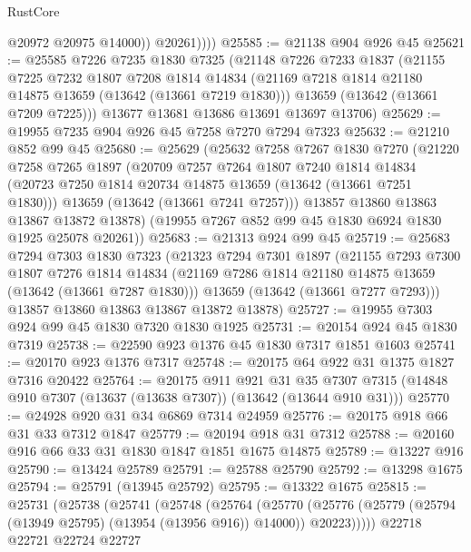 \begin{lexlean}{RustCore}
\begin{coremodule}
                @20972
                @20975
                @14000))
            @20261))))
@25585 := @21138 @904 @926 @45
@25621 := @25585
    @7226
    @7235
    @1830
    @7325
    (@21148
      @7226
      @7233
      @1837
      (@21155
        @7225
        @7232
        @1807
        @7208
        @1814
        @14834
        (@21169 @7218 @1814 @21180 @14875 @13659 (@13642 (@13661 @7219 @1830)))
        @13659
        (@13642 (@13661 @7209 @7225)))
      @13677
      @13681
      @13686
      @13691
      @13697
      @13706)
@25629 := @19955 @7235 @904 @926 @45 @7258 @7270 @7294 @7323
@25632 := @21210 @852 @99 @45
@25680 := @25629
    (@25632
      @7258
      @7267
      @1830
      @7270
      (@21220
        @7258
        @7265
        @1897
        (@20709
          @7257
          @7264
          @1807
          @7240
          @1814
          @14834
          (@20723 @7250 @1814 @20734 @14875 @13659 (@13642 (@13661 @7251 @1830)))
          @13659
          (@13642 (@13661 @7241 @7257)))
        @13857
        @13860
        @13863
        @13867
        @13872
        @13878)
      (@19955 @7267 @852 @99 @45 @1830 @6924 @1830 @1925 @25078 @20261))
@25683 := @21313 @924 @99 @45
@25719 := @25683
    @7294
    @7303
    @1830
    @7323
    (@21323
      @7294
      @7301
      @1897
      (@21155
        @7293
        @7300
        @1807
        @7276
        @1814
        @14834
        (@21169 @7286 @1814 @21180 @14875 @13659 (@13642 (@13661 @7287 @1830)))
        @13659
        (@13642 (@13661 @7277 @7293)))
      @13857
      @13860
      @13863
      @13867
      @13872
      @13878)
@25727 := @19955 @7303 @924 @99 @45 @1830 @7320 @1830 @1925
@25731 := @20154 @924 @45 @1830 @7319
@25738 := @22590 @923 @1376 @45 @1830 @7317 @1851 @1603
@25741 := @20170 @923 @1376 @7317
@25748 := @20175 @64 @922 @31 @1375 @1827 @7316 @20422
@25764 := @20175
    @911
    @921
    @31
    @35
    @7307
    @7315
    (@14848 @910 @7307 (@13637 (@13638 @7307)) (@13642 (@13644 @910 @31)))
@25770 := @24928 @920 @31 @34 @6869 @7314 @24959
@25776 := @20175 @918 @66 @31 @33 @7312 @1847
@25779 := @20194 @918 @31 @7312
@25788 := @20160 @916 @66 @33 @31 @1830 @1847 @1851 @1675 @14875
@25789 := @13227 @916
@25790 := @13424 @25789
@25791 := @25788 @25790
@25792 := @13298 @1675
@25794 := @25791 (@13945 @25792)
@25795 := @13322 @1675
@25815 := @25731
    (@25738
      (@25741
        (@25748
          (@25764
            (@25770
              (@25776 (@25779 (@25794 (@13949 @25795) (@13954 (@13956 @916)) @14000)) @20223)))))
      @22718
      @22721
      @22724
      @22727

\end{coremodule}
\end{lexlean}

